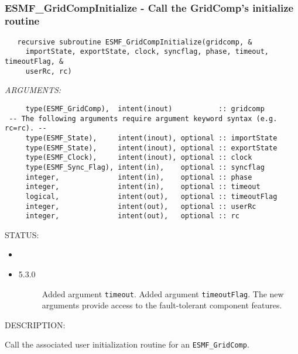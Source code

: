 \mbox{}\hrulefill\ 
 
\subsubsection [ESMF\_GridCompInitialize] {ESMF\_GridCompInitialize - Call the GridComp's initialize routine}


 
\begin{verbatim}   recursive subroutine ESMF_GridCompInitialize(gridcomp, &
     importState, exportState, clock, syncflag, phase, timeout, timeoutFlag, &
     userRc, rc)\end{verbatim}{\em ARGUMENTS:}
\begin{verbatim}     type(ESMF_GridComp),  intent(inout)           :: gridcomp
 -- The following arguments require argument keyword syntax (e.g. rc=rc). --
     type(ESMF_State),     intent(inout), optional :: importState
     type(ESMF_State),     intent(inout), optional :: exportState
     type(ESMF_Clock),     intent(inout), optional :: clock
     type(ESMF_Sync_Flag), intent(in),    optional :: syncflag
     integer,              intent(in),    optional :: phase
     integer,              intent(in),    optional :: timeout
     logical,              intent(out),   optional :: timeoutFlag
     integer,              intent(out),   optional :: userRc
     integer,              intent(out),   optional :: rc\end{verbatim}
{\sf STATUS:}
   \begin{itemize}
   \item{}
   \item{}
   \begin{description}
   \item[5.3.0] Added argument {\tt timeout}.
                Added argument {\tt timeoutFlag}.
                The new arguments provide access to the fault-tolerant component
                features.
   \end{description}
   \end{itemize}
  
{\sf DESCRIPTION:\\ }


   Call the associated user initialization routine for
   an {\tt ESMF\_GridComp}.
  
